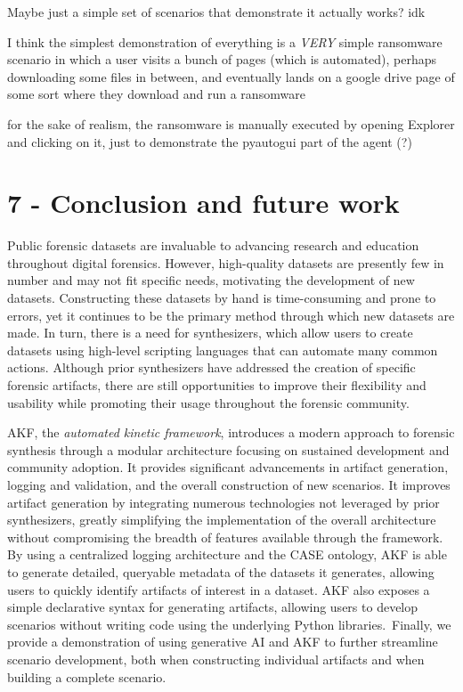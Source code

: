 Maybe just a simple set of scenarios that demonstrate it actually works?
idk

I think the simplest demonstration of everything is a \emph{VERY} simple
ransomware scenario in which a user visits a bunch of pages (which is
automated), perhaps downloading some files in between, and eventually
lands on a google drive page of some sort where they download and run a
ransomware

for the sake of realism, the ransomware is manually executed by opening
Explorer and clicking on it, just to demonstrate the pyautogui part of
the agent (?)

\section{7 - Conclusion and future
work}\label{conclusion-and-future-work}

Public forensic datasets are invaluable to advancing research and
education throughout digital forensics. However, high-quality datasets
are presently few in number and may not fit specific needs, motivating
the development of new datasets. Constructing these datasets by hand is
time-consuming and prone to errors, yet it continues to be the primary
method through which new datasets are made. In turn, there is a need for
synthesizers, which allow users to create datasets using high-level
scripting languages that can automate many common actions. Although
prior synthesizers have addressed the creation of specific forensic
artifacts, there are still opportunities to improve their flexibility
and usability while promoting their usage throughout the forensic
community.

AKF, the \emph{automated kinetic framework}, introduces a modern
approach to forensic synthesis through a modular architecture focusing
on sustained development and community adoption. It provides significant
advancements in artifact generation, logging and validation, and the
overall construction of new scenarios. It improves artifact generation
by integrating numerous technologies not leveraged by prior
synthesizers, greatly simplifying the implementation of the overall
architecture without compromising the breadth of features available
through the framework. By using a centralized logging architecture and
the CASE ontology, AKF is able to generate detailed, queryable metadata
of the datasets it generates, allowing users to quickly identify
artifacts of interest in a dataset. AKF also exposes a simple
declarative syntax for generating artifacts, allowing users to develop
scenarios without writing code using the underlying Python
libraries.~Finally, we provide a demonstration of using generative AI
and AKF to further streamline scenario development, both when
constructing individual artifacts and when building a complete scenario.

